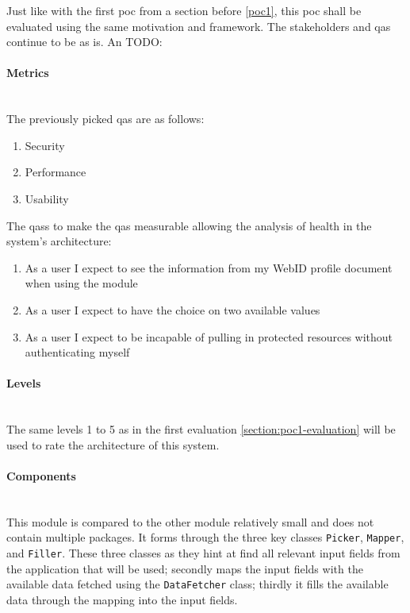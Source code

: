 Just like with the first \gls{poc} from a section before \ref{poc1}, this \gls{poc} shall be evaluated using the same motivation and framework. The stakeholders and \glspl{qa} continue to be as is. An 
TODO:
\vspace{0.5cm}
\paragraph{Metrics}\mbox{}\\

The previously picked \glspl{qa} are as follows:

\begin{enumerate}
    \item Security
    \item Performance
    \item Usability
\end{enumerate}

The \glspl{qas} to make the \glspl{qa} measurable allowing the analysis of health in the system's architecture:

\begin{enumerate}
    \item As a user I expect to see the information from my WebID profile document when using the module
    \item As a user I expect to have the choice on two available values
    \item As a user I expect to be incapable of pulling in protected resources without authenticating myself
\end{enumerate}
\vspace{0.5cm}
\paragraph{Levels}\mbox{}\\

The same levels 1 to 5 as in the first evaluation \ref{section:poc1-evaluation} will be used to rate the architecture of this system.
\vspace{0.5cm}
\paragraph{Components}\mbox{}\\

This module is compared to the other module relatively small and does not contain multiple packages. It forms through the three key classes \texttt{Picker}, \texttt{Mapper}, and \texttt{Filler}. These three classes as they hint at find all relevant input fields from the application that will be used; secondly maps the input fields with the available data fetched using the \texttt{DataFetcher} class; thirdly it fills the available data through the mapping into the input fields.

